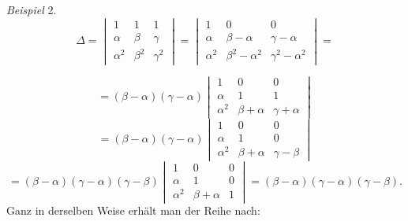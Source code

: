 \textit{Beispiel} 2.
\[
\varDelta = \begin{vmatrix} 1 & 1 & 1\\ \alpha & \beta & \gamma\\ \alpha^2 & \beta^2 & \gamma^2\end{vmatrix}
= \begin{vmatrix} 1 & 0 & 0\\ \alpha & \beta-\alpha & \gamma-\alpha\\ \alpha^2 & \beta^2-\alpha^2 & \gamma^2-\alpha^2\end{vmatrix}
=
\]


\[
= (\beta-\alpha)(\gamma-\alpha) \begin{vmatrix} 1 & 0 & 0\\ \alpha & 1 & 1\\ \alpha^2 & \beta+\alpha & \gamma+\alpha\end{vmatrix}
\]
\[
= (\beta-\alpha)(\gamma-\alpha) \begin{vmatrix} 1 & 0 & 0\\ \alpha & 1 & 0\\ \alpha^2 & \beta+\alpha & \gamma-\beta\end{vmatrix}
\]
\[
= (\beta-\alpha)(\gamma-\alpha)(\gamma-\beta) \begin{vmatrix} 1 & 0 & 0\\ \alpha & 1 & 0\\ \alpha^2 & \beta+\alpha & 1\end{vmatrix} = (\beta-\alpha)(\gamma-\alpha)(\gamma-\beta).
\]
Ganz in derselben Weise erhält man der Reihe nach:

